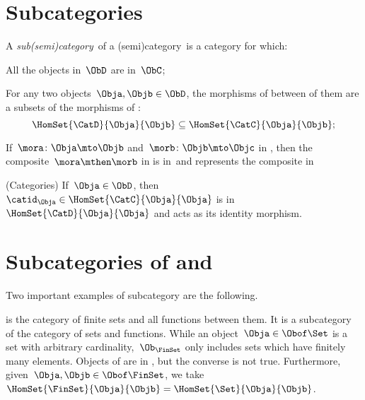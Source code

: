 
\section{Subcategories}
\label{sec:subcategories}



\begin{ctdefinition}[Subcategory]
    \label{def:subcategory}
    A \emph{sub(semi)category}~\CatD of a (semi)category~\CatC is a category for which:
    \begin{compactenum}
        \item All the objects in~$\ObD$ are in~$\ObC$;
        \item For any two objects~$\Obja,\Objb\in \ObD$,
              the morphisms of \CatD between of them are a subsets of the morphisms of \CatC:
              \begin{equation}
                  \HomSet{\CatD}{\Obja}{\Objb}\subseteq \HomSet{\CatC}{ \Obja}{\Objb};
              \end{equation}
        \item If~$\mora \colon \Obja \mto \Objb$ and~$\morb\colon \Objb\mto \Objc$ in \CatD, then the composite~$\mora \mthen \morb$ in \CatC is in~\CatD and represents the composite in~\CatD
        \item (Categories) If~$\Obja\in \ObD$, then~$\catid_\Obja \in \HomSet{\CatC}{\Obja}{\Obja}$ is in~$\HomSet{\CatD}{\Obja}{\Obja}$ and acts as its identity morphism.
    \end{compactenum}
\end{ctdefinition}

\section{Subcategories of \Rel and \Set}

Two important examples of subcategory are the following.

\begin{example}
    \label{ex:FinSet}
    \iindex{\FinSet} is the category of finite sets and all functions between them.
    It is a subcategory of the category \Set of sets and functions.
    While an object~$\Obja \in \Obof\Set$ is a set with arbitrary cardinality,~$\Ob_{\FinSet}$ only includes sets which have finitely many elements.
    Objects of \FinSet are in \Set, but the converse is not true.
    Furthermore, given~$\Obja,\Objb\in \Obof\FinSet$, we take~$\HomSet{\FinSet}{\Obja}{\Objb} =\HomSet{\Set}{\Obja}{\Objb}$.
\end{example}

